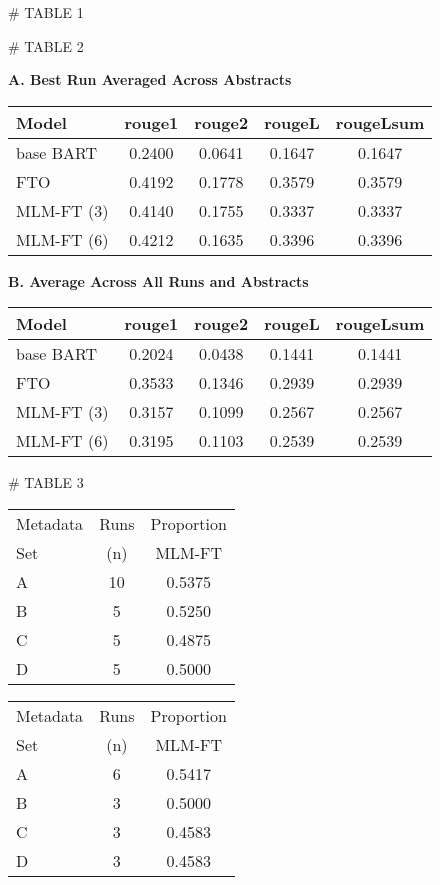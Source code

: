 # TABLE 1

# TABLE 2

\begin{table}[htbp]
\centering
\textbf{A. Best Run Averaged Across Abstracts}
\begin{tabular}{lcccc}
\toprule
Model & rouge1 & rouge2 & rougeL & rougeLsum \\
\midrule
base BART & 0.2400 & 0.0641 & 0.1647 & 0.1647 \\
FTO & 0.4192 & 0.1778 & 0.3579 & 0.3579 \\
MLM-FT (3) & 0.4140 & 0.1755 & 0.3337 & 0.3337 \\
MLM-FT (6) & 0.4212 & 0.1635 & 0.3396 & 0.3396 \\
\bottomrule
\end{tabular}
\label{tab:my-table-A}
\end{table}

\begin{table}[htbp]
\centering
\textbf{B. Average Across All Runs and Abstracts}
\begin{tabular}{lcccc}
\toprule
Model & rouge1 & rouge2 & rougeL & rougeLsum \\
\midrule
base BART & 0.2024 & 0.0438 & 0.1441 & 0.1441 \\
FTO & 0.3533 & 0.1346 & 0.2939 & 0.2939 \\
MLM-FT (3) & 0.3157 & 0.1099 & 0.2567 & 0.2567 \\
MLM-FT (6) & 0.3195 & 0.1103 & 0.2539 & 0.2539 \\
\bottomrule
\end{tabular}
\label{tab:my-table-B}
\end{table}

# TABLE 3
\begin{table}[htbp]
    \centering
    \label{tab:metadata-proportion}
    \huge
    \begin{tabular}{@{}lcc@{}}
      \toprule
      Metadata & Runs & Proportion\\
      Set & (n) & MLM-FT \\
      \midrule
      A & 10 & 0.5375 \\
      B & 5 & 0.5250 \\
      C & 5 & 0.4875 \\
      D & 5 & 0.5000 \\
      \bottomrule
    \end{tabular}
\end{table}

\begin{table}[htbp]
    \centering
    \label{tab:metadata-proportion}
    \huge
    \begin{tabular}{@{}lcc@{}}
      \toprule
      Metadata & Runs & Proportion\\
      Set & (n) & MLM-FT \\
      \midrule
      A & 6 & 0.5417 \\
      B & 3 & 0.5000 \\
      C & 3 & 0.4583 \\
      D & 3 & 0.4583 \\
      \bottomrule
    \end{tabular}
\end{table}

